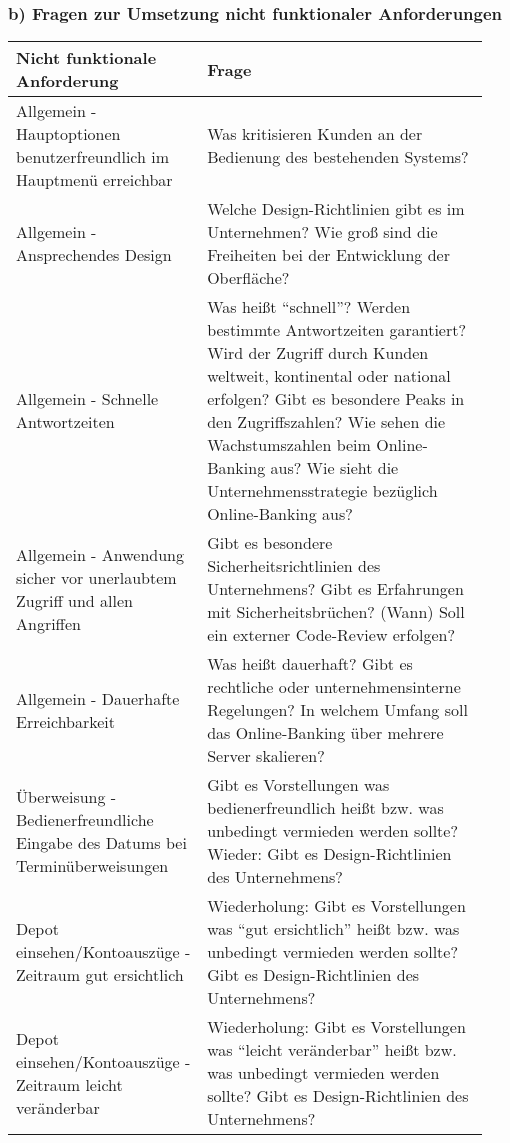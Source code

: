 \documentclass[a4paper,10pt]{article}
\begin{document}
\subsubsection*{b) Fragen zur Umsetzung nicht funktionaler Anforderungen}
\begin{tabular}{|p{0.37\linewidth}|p{0.57\linewidth}|}
\hline
\textbf{Nicht funktionale Anforderung} & \textbf{Frage} \\
\hline
Allgemein \-- Hauptoptionen benutzerfreundlich im Hauptmenü erreichbar &  Was kritisieren Kunden an der Bedienung des bestehenden Systems? \\
\hline
Allgemein \-- Ansprechendes Design & Welche Design-Richtlinien gibt es im Unternehmen? Wie groß sind die Freiheiten bei der Entwicklung der Oberfläche? \\
\hline
Allgemein \-- Schnelle Antwortzeiten & Was heißt ``schnell''? Werden bestimmte Antwortzeiten garantiert? Wird der Zugriff durch Kunden weltweit, kontinental oder national erfolgen?  Gibt es besondere Peaks in den Zugriffszahlen? Wie sehen die Wachstumszahlen beim Online-Banking aus? Wie sieht die Unternehmensstrategie bezüglich Online-Banking aus? \\
\hline
Allgemein \-- Anwendung sicher vor unerlaubtem Zugriff und allen Angriffen & Gibt es besondere Sicherheitsrichtlinien des Unternehmens? Gibt es Erfahrungen mit Sicherheitsbrüchen? (Wann) Soll ein externer Code-Review erfolgen? \\
\hline
Allgemein \-- Dauerhafte Erreichbarkeit & Was heißt dauerhaft? Gibt es rechtliche oder unternehmensinterne Regelungen? In welchem Umfang soll das Online-Banking über mehrere Server skalieren? \\
\hline
\hline
Überweisung \-- Bedienerfreundliche Eingabe des Datums bei Terminüberweisungen & Gibt es Vorstellungen was bedienerfreundlich heißt bzw. was unbedingt vermieden werden sollte? Wieder: Gibt es Design-Richtlinien des Unternehmens? \\
\hline
\hline
Depot einsehen/Kontoauszüge \-- Zeitraum gut ersichtlich & Wiederholung: Gibt es Vorstellungen was ``gut ersichtlich'' heißt bzw. was unbedingt vermieden werden sollte? Gibt es Design-Richtlinien des Unternehmens? \\
\hline
Depot einsehen/Kontoauszüge \-- Zeitraum leicht veränderbar & Wiederholung: Gibt es Vorstellungen was ``leicht veränderbar'' heißt bzw. was unbedingt vermieden werden sollte? Gibt es Design-Richtlinien des Unternehmens?\\
\hline
\end{tabular}
\end{document}
